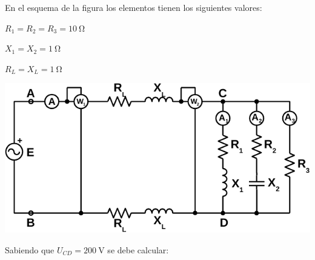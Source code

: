\documentclass[12pt]{article}
\begin{document}

En el esquema de la figura los elementos tienen los siguientes valores:

$R_1 = R_2 = R_3 = \SI{10}{\ohm}$

$X_1 = X_2 = \SI{1}{\ohm}$%

$R_L = X_L = \SI{1}{\ohm}$

\begin{center}
  \includegraphics{figs/circuitoA.pdf}
\end{center}

Sabiendo que $U_{CD} = \SI{200}{\volt}$ se debe calcular:
\end{document}
